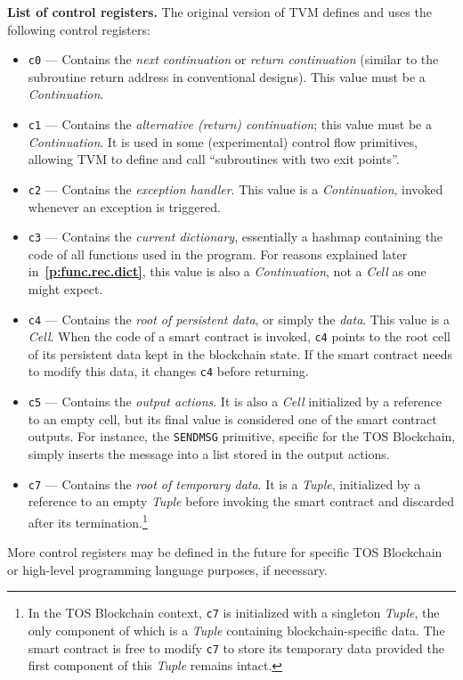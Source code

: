 \documentclass[12pt,oneside]{article}
\def\makepoint#1{\medbreak\noindent{\bf #1.\ }}
\def\nxsubpoint{\refstepcounter{subsubsection}%
  \smallbreak\makepoint{\thesubsubsection}}
\def\refpoint#1{{\rm\textbf{\ref{#1}}}}
\let\ptref=\refpoint
\def\emb#1{\textbf{#1.}}
\begin{document}
\nxsubpoint\label{sp:cr.list}\emb{List of control registers}
The original version of TVM defines and uses the following control registers:
\begin{itemize}
\item \texttt{c0} --- Contains the {\em next continuation} or {\em return continuation} (similar to the subroutine return address in conventional designs). This value must be a {\em Continuation}.
\item \texttt{c1} --- Contains the {\em alternative (return) continuation}; this value must be a {\em Continuation}. It is used in some (experimental) control flow primitives, allowing TVM to define and call ``subroutines with two exit points''.
\item \texttt{c2} --- Contains the {\em exception handler}. This value is a {\em Continuation},  invoked whenever an exception is triggered.
\item \texttt{c3} --- Contains the {\em current dictionary}, essentially a hashmap containing the code of all functions used in the program. For reasons explained later in~\ptref{p:func.rec.dict}, this value is also a {\em Continuation}, not a {\em Cell\/} as one might expect.
\item \texttt{c4} --- Contains the {\em root of persistent data}, or simply the {\em data}. This value is a {\em Cell}. When the code of a smart contract is invoked, \texttt{c4} points to the root cell of its persistent data kept in the blockchain state. If the smart contract needs to modify this data, it changes \texttt{c4} before returning.
\item \texttt{c5} --- Contains the {\em output actions}. It is also a {\em Cell\/} initialized by a reference to an empty cell, but its final value is considered one of the smart contract outputs. For instance, the {\tt SENDMSG} primitive, specific for the TOS Blockchain, simply inserts the message into a list stored in the output actions.
\item \texttt{c7} --- Contains the {\em root of temporary data}. It is a {\em Tuple}, initialized by a reference to an empty {\em Tuple\/} before invoking the smart contract and discarded after its termination.\footnote{In the TOS Blockchain context, \texttt{c7} is initialized with a singleton {\em Tuple}, the only component of which is a {\em Tuple\/} containing blockchain-specific data. The smart contract is free to modify \texttt{c7} to store its temporary data provided the first component of this {\em Tuple\/} remains intact.}
\end{itemize}
More control registers may be defined in the future for specific TOS Block\-chain or high-level programming language purposes, if necessary.
\end{document}
